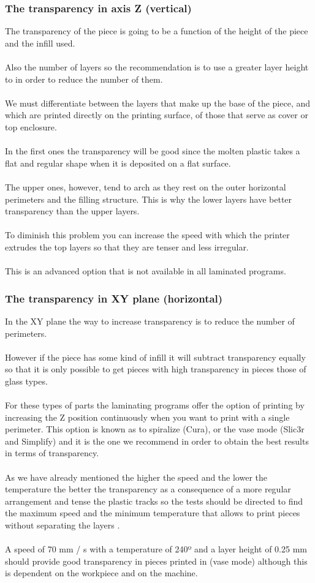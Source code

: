 \documentclass[11pt,a4paper]{article}
\begin{document}
		\subsubsection{The transparency in axis Z (vertical)}The transparency of the piece is going to be a function of the height of the piece and the infill used.
\\\\
Also the number of layers so the recommendation is to use a greater layer height to in order to reduce the number of them.
\\\\
We must differentiate between the layers that make up the base of the piece, and which are printed directly on the printing surface, of those that serve as cover or top enclosure.
\\\\
In the first ones the transparency will be good since the molten plastic takes a flat and regular shape when it is deposited on a flat surface.
\\\\
The upper ones, however, tend to arch as they rest on the outer horizontal perimeters and the filling structure. This is why the lower layers have better transparency than the upper layers.
\\\\
To diminish this problem you can increase the speed with which the printer extrudes the top layers so that they are tenser and less irregular.
\\\\
This is an advanced option that is not available in all laminated programs.
		\subsubsection{The transparency in XY plane (horizontal)}In the XY plane the way to increase transparency is to reduce the number of perimeters.
\\\\
However if the piece has some kind of infill it will subtract transparency equally so that it is only possible to get pieces with high transparency in pieces those of glass types.
\\\\
For these types of parts the laminating programs offer the option of printing by increasing the Z position continuously when you want to print with a single perimeter. This option is known as to spiralize (Cura), or the vase mode (Slic3r and Simplify) and it is the one we recommend in order to obtain the best results in terms of transparency.
\\\\
As we have already mentioned the higher the speed and the lower the temperature the better the transparency as a consequence of a more regular arrangement and tense the plastic tracks so the tests should be directed to find the maximum speed and the minimum temperature that allows to print pieces without separating the layers .
\\\\
A speed of 70 mm / s with a temperature of 240º and a layer height of 0.25 mm should provide good transparency in pieces printed in (vase mode) although this is dependent on the workpiece and on the machine.
\end{document}
